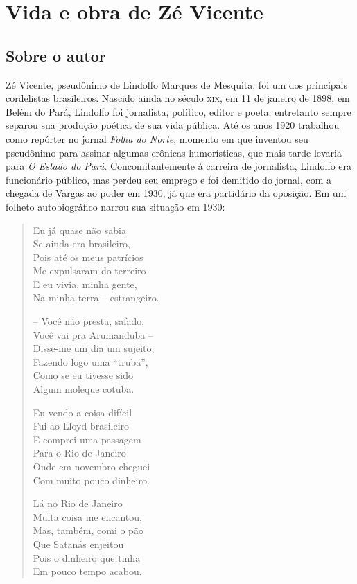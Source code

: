 \chapter{Vida e obra de Zé Vicente}

\section{Sobre o autor}

\noindent{}Zé Vicente, pseudônimo de Lindolfo Marques de Mesquita, foi um dos
principais cordelistas brasileiros. Nascido ainda no século \textsc{xix}, em 11 de
janeiro de 1898, em Belém do Pará, Lindolfo foi jornalista, político,
editor e poeta, entretanto sempre separou sua produção poética de sua
vida pública. Até os anos 1920 trabalhou como repórter no jornal \textit{Folha
do Norte}, momento em que inventou seu pseudônimo para assinar algumas
crônicas humorísticas, que mais tarde levaria para \textit{O Estado do Pará}.
Concomitantemente à carreira de jornalista, Lindolfo era funcionário
público, mas perdeu seu emprego e foi demitido do jornal, com a chegada
de Vargas ao poder em 1930, já que era partidário da oposição.
Em um folheto autobiográfico narrou sua situação em 1930:

\begin{verse}
Eu já quase não sabia\\
Se ainda era brasileiro,\\
Pois até os meus patrícios\\
Me expulsaram do terreiro\\
E eu vivia, minha gente, \\
Na minha terra -- estrangeiro.

-- Você não presta, safado, \\
Você vai pra Arumanduba --\\
Disse-me um dia um sujeito,\\
Fazendo logo uma “truba”,\\
Como se eu tivesse sido\\
Algum moleque cotuba.

Eu vendo a coisa difícil\\
Fui ao Lloyd brasileiro\\
E comprei uma passagem\\
Para o Rio de Janeiro\\
Onde em novembro cheguei\\
Com muito pouco dinheiro.

Lá no Rio de Janeiro\\
Muita coisa me encantou,\\
Mas, também, comi o pão\\
Que Satanás enjeitou\\
Pois o dinheiro que tinha\\
Em pouco tempo acabou.
\end{verse}

